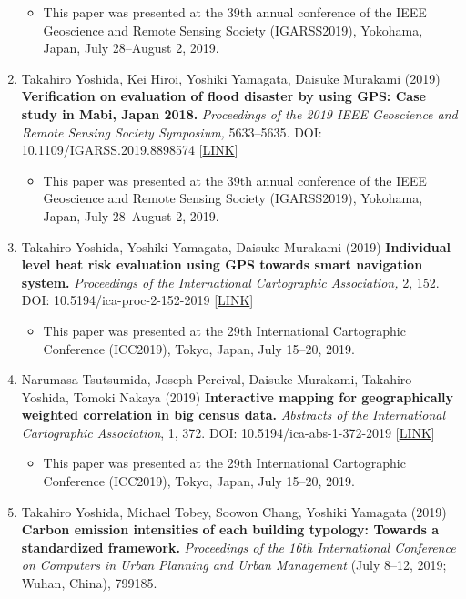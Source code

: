 \documentclass[
]{book}
\providecommand{\tightlist}{%
  \setlength{\itemsep}{0pt}\setlength{\parskip}{0pt}}
\begin{document}
\begin{enumerate}
  \begin{itemize}
  \tightlist
  \item
    This paper was presented at the 39th annual conference of the IEEE Geoscience and Remote Sensing Society (IGARSS2019), Yokohama, Japan, July 28--August 2, 2019.
  \end{itemize}
\item
  Takahiro Yoshida, Kei Hiroi, Yoshiki Yamagata, Daisuke Murakami (2019)
  \textbf{Verification on evaluation of flood disaster by using GPS: Case study in Mabi, Japan 2018.}
  \emph{Proceedings of the 2019 IEEE Geoscience and Remote Sensing Society Symposium,} 5633--5635.
  DOI: 10.1109/IGARSS.2019.8898574 {[}\href{https://ieeexplore.ieee.org/document/8898574}{LINK}{]}

  \begin{itemize}
  \tightlist
  \item
    This paper was presented at the 39th annual conference of the IEEE Geoscience and Remote Sensing Society (IGARSS2019), Yokohama, Japan, July 28--August 2, 2019.
  \end{itemize}
\item
  Takahiro Yoshida, Yoshiki Yamagata, Daisuke Murakami (2019)
  \textbf{Individual level heat risk evaluation using GPS towards smart navigation system.}
  \emph{Proceedings of the International Cartographic Association,} 2, 152.
  DOI: 10.5194/ica-proc-2-152-2019 {[}\href{https://www.proc-int-cartogr-assoc.net/2/152/2019/}{LINK}{]}

  \begin{itemize}
  \tightlist
  \item
    This paper was presented at the 29th International Cartographic Conference (ICC2019), Tokyo, Japan, July 15--20, 2019.
  \end{itemize}
\item
  Narumasa Tsutsumida, Joseph Percival, Daisuke Murakami, Takahiro Yoshida, Tomoki Nakaya (2019)
  \textbf{Interactive mapping for geographically weighted correlation in big census data.}
  \emph{Abstracts of the International Cartographic Association}, 1, 372.
  DOI: 10.5194/ica-abs-1-372-2019 {[}\href{https://www.abstr-int-cartogr-assoc.net/1/372/2019/}{LINK}{]}

  \begin{itemize}
  \tightlist
  \item
    This paper was presented at the 29th International Cartographic Conference (ICC2019), Tokyo, Japan, July 15--20, 2019.
  \end{itemize}
\item
  Takahiro Yoshida, Michael Tobey, Soowon Chang, Yoshiki Yamagata (2019)
  \textbf{Carbon emission intensities of each building typology: Towards a standardized framework.}
  \emph{Proceedings of the 16th International Conference on Computers in Urban Planning and Urban Management} (July 8--12, 2019; Wuhan, China), 799185.


\end{enumerate}
\end{document}
